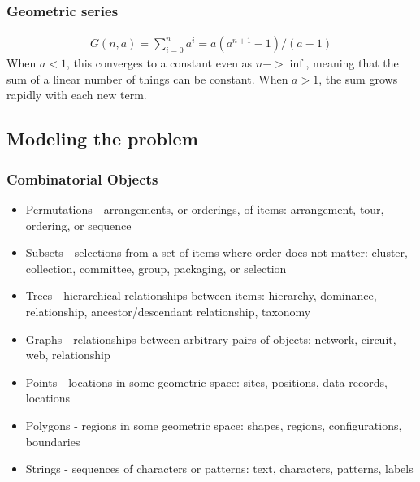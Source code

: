 \documentclass[10pt]{article}
\theoremstyle{definition}
\begin{document}
\subsubsection{Geometric series}
\begin{align*}
    G(n,a)=\sum_{i=0}^na^i=a(a^{n+1}-1)/(a-1)
\end{align*}
When $a<1$, this converges to a constant even as $n->\inf$, meaning that the sum of a linear number of things can be constant. When $a>1$, the sum grows rapidly with each new term.

\subsection{Modeling the problem}
\subsubsection{Combinatorial Objects}
\begin{itemize}
    \item Permutations - arrangements, or orderings, of items: arrangement, tour, ordering, or sequence
    \item Subsets - selections from a set of items where order does not matter: cluster, collection, committee, group, packaging, or selection
    \item Trees - hierarchical relationships between items: hierarchy, dominance, relationship, ancestor/descendant relationship, taxonomy
    \item Graphs - relationships between arbitrary pairs of objects: network, circuit, web, relationship
    \item Points - locations in some geometric space: sites, positions, data records, locations
    \item Polygons - regions in some geometric space: shapes, regions, configurations, boundaries
    \item Strings - sequences of characters or patterns: text, characters, patterns, labels
\end{itemize}
\end{document}
